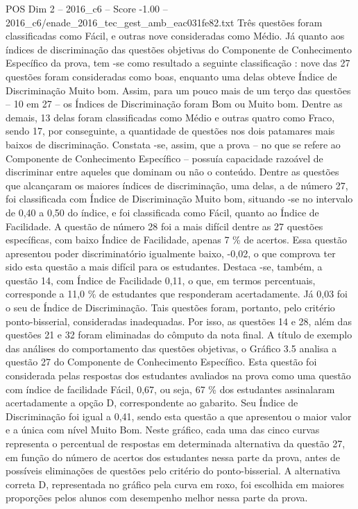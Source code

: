 \begin{textsample}{POS Dim 2 – 2016\_c6 – Score -1.00 – 2016\_c6/enade\_2016\_tec\_gest\_amb\_eac031fe82.txt}
Três questões foram classificadas como Fácil, e outras nove consideradas como Médio.
Já quanto aos índices de discriminação das questões objetivas do Componente de Conhecimento Específico da prova, tem -se como resultado a seguinte classificação : nove das 27 questões foram consideradas como boas, enquanto uma delas obteve Índice de Discriminação Muito bom.
Assim, para um pouco mais de um terço das questões – 10 em 27 – os Índices de Discriminação foram Bom ou Muito bom.
Dentre as demais, 13 delas foram classificadas como Médio e outras quatro como Fraco, sendo 17, por conseguinte, a quantidade de questões nos dois patamares mais baixos de discriminação.
Constata -se, assim, que a prova – no que se refere ao Componente de Conhecimento Específico – possuía capacidade razoável de discriminar entre aqueles que dominam ou não o conteúdo.
Dentre as questões que alcançaram os maiores índices de discriminação, uma delas, a de número 27, foi classificada com Índice de Discriminação Muito bom, situando -se no intervalo de 0,40 a 0,50 do índice, e foi classificada como Fácil, quanto ao Índice de Facilidade.
A questão de número 28 foi a mais difícil dentre as 27 questões específicas, com baixo Índice de Facilidade, apenas 7 \% de acertos.
Essa questão apresentou poder discriminatório igualmente baixo, -0,02, o que comprova ter sido esta questão a mais difícil para os estudantes.
Destaca -se, também, a questão 14, com Índice de Facilidade 0,11, o que, em termos percentuais, corresponde a 11,0 \% de estudantes que responderam acertadamente.
Já 0,03 foi o seu de Índice de Discriminação.
Tais questões foram, portanto, pelo critério ponto-bisserial, consideradas inadequadas.
Por isso, as questões 14 e 28, além das questões 21 e 32 foram eliminadas do cômputo da nota final.
A título de exemplo das análises do comportamento das questões objetivas, o Gráfico 3.5 analisa a questão 27 do Componente de Conhecimento Específico.
Esta questão foi considerada pelas respostas dos estudantes avaliados na prova como uma questão com índice de facilidade Fácil, 0,67, ou seja, 67 \% dos estudantes assinalaram acertadamente a opção D, correspondente ao gabarito.
Seu Índice de Discriminação foi igual a 0,41, sendo esta questão a que apresentou o maior valor e a única com nível Muito Bom.
Neste gráfico, cada uma das cinco curvas representa o percentual de respostas em determinada alternativa da questão 27, em função do número de acertos dos estudantes nessa parte da prova, antes de possíveis eliminações de questões pelo critério do ponto-bisserial.
A alternativa correta D, representada no gráfico pela curva em roxo, foi escolhida em maiores proporções pelos alunos com desempenho melhor nessa parte da prova.

\end{textsample}
